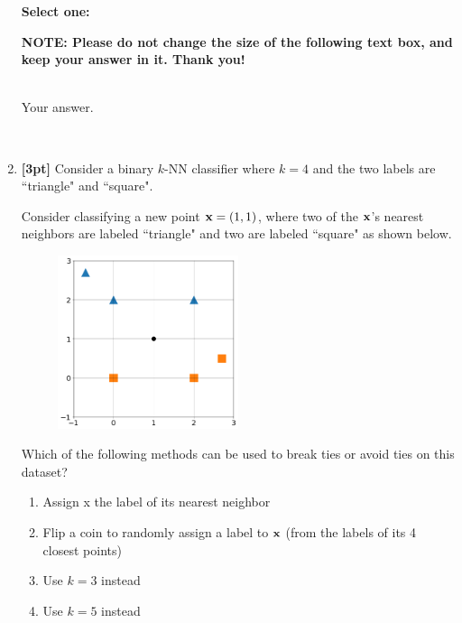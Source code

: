 \documentclass[12pt]{article}
\renewcommand{\circle}{\tikz\draw[black] (0,0) circle (1ex);}
\begin{document}
\begin{enumerate}
    \textbf{Select one:}

    \textbf{NOTE: Please do not change the size of the following text box, and keep your answer in it. Thank you!} \\ \\
    \begin{tcolorbox}[fit,height=4cm, width=15cm, blank, borderline={1pt}{-2pt},nobeforeafter]
    \large
    Your answer.

    \end{tcolorbox} \\

    
    
    \item \textbf{[3pt]} Consider a binary $k$-NN classifier where $k=4$ and the two labels are ``triangle" and ``square".
    
    Consider classifying a new point $\mathbf{x} =(1,1)$, where two of the $\mathbf{x}$'s nearest neighbors are labeled ``triangle" and two are labeled ``square" as shown below.
    
    \begin{figure}[H]
        \centering
        \includegraphics[width = 0.5\textwidth]{1-1-5.png}
        \label{Q_5knn}
    \end{figure}
    
    Which of the following methods can be used to break ties or avoid ties on this dataset?
    
    \begin{enumerate}
        \item Assign x the label of its nearest neighbor
        \item Flip a coin to randomly assign a label to $\mathbf{x}$ (from the labels of its 4 closest points)
        \item Use $k = 3$ instead
        \item Use $k = 5$ instead
    \end{enumerate}


\end{enumerate}
\end{document}
